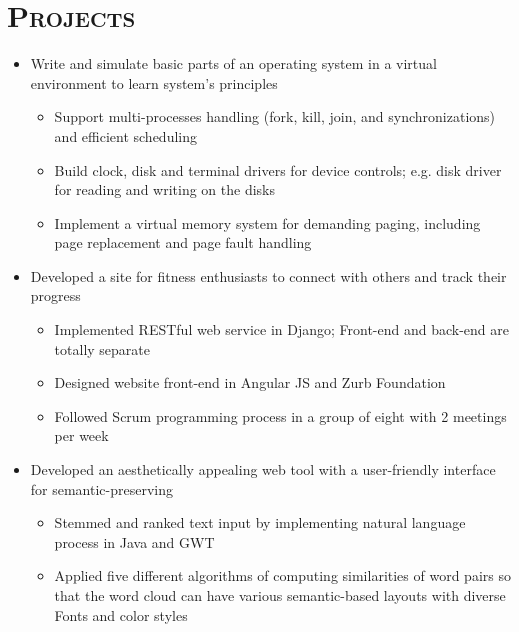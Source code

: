 \documentclass[11.7pt,letterpaper]{article}
\begin{document}
\begin{minipage}{\textwidth}
\vspace{-1mm}
\section{\scshape Projects}
\vspace{-1mm}
\begin{itemize}
	\item Write and simulate basic parts of an operating system in a virtual environment to learn system's principles
	\begin{itemize}
		\item Support multi-processes handling (fork, kill, join, and synchronizations) and efficient scheduling 
		\item Build clock, disk and terminal drivers for device controls; e.g. disk driver for reading and writing on the disks
		\item Implement a virtual memory system for demanding paging, including page replacement and page fault handling  
	\end{itemize}
\end{itemize}
\begin{itemize}
\item Developed a site for fitness enthusiasts to connect with others and track their progress
\begin{itemize}
\item Implemented RESTful web service in Django; Front-end and back-end are totally separate
\item Designed website front-end in Angular JS and Zurb Foundation 
\item Followed Scrum programming process in a group of eight with 2 meetings per week
\end{itemize}

 \item Developed an aesthetically appealing web tool with a user-friendly interface for semantic-preserving \href{http://wordcloud.cs.arizona.edu/}{\bfseries \underline{\color{blue}{word
cloud}}}
\begin{itemize}

\item Stemmed and ranked text input by implementing natural language process in Java and GWT


\item Applied five different algorithms of computing 
similarities of word pairs so that the word cloud can have various semantic-based layouts with diverse Fonts and color styles
\end{itemize}


\end{itemize}
\end{minipage}
\end{document}

